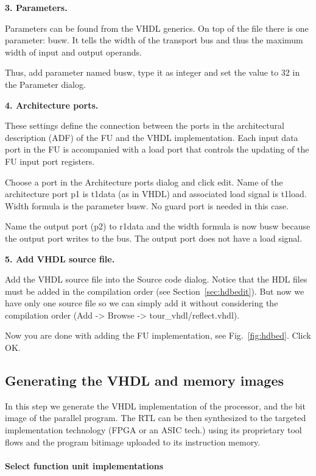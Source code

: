 \documentclass[a4paper,twoside]{tceusermanual}
\begin{document}
\begin{enumerate}
\textbf{3. Parameters.}

Parameters can be found from the VHDL generics. On top of the file there is one
parameter: busw. It tells the width of the transport bus and thus the maximum
width of input and output operands.

Thus, add parameter named busw, type it as integer and set the value to 32 in the
Parameter dialog.

\textbf{4. Architecture ports.}

These settings define the connection between the ports in the
architectural description (ADF) of the FU and the VHDL implementation.
Each input data port in the FU is accompanied with a load port that
controls the updating of the FU input port registers.

Choose a port in the Architecture ports dialog and click edit.  Name
of the architecture port p1 is t1data (as in VHDL) and associated load
signal is t1load.  Width formula is the parameter busw. No guard port is
needed in this case.

Name the output port (p2) to r1data and the width formula is now busw
because the output port writes to the bus.
The output port does not have a load signal.

\textbf{5. Add VHDL source file.}

Add the VHDL source file into the Source code dialog. Notice that the HDL
files must be added in the compilation order (see Section~\ref{sec:hdbedit}).
But now we have only one source file so we can simply add it without
considering the compilation order (Add -> Browse -> tour\_vhdl/reflect.vhdl).

Now you are done with adding the FU implementation, see Fig.~\ref{fig:hdbed}. Click OK.

\end{enumerate}

\subsection{Generating the VHDL and memory images}
\label{ssec:tcetour_final_products}

In this step we generate the VHDL implementation of the processor, and the
bit image of the parallel program. The RTL can be then synthesized to the
targeted implementation technology (FPGA or an ASIC tech.) using its proprietary
tool flows and the program bitimage uploaded to its instruction memory.

\paragraph{Select function unit implementations}
\end{document}
